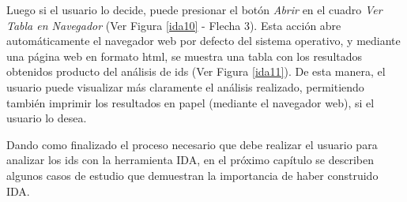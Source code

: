 
Luego si el usuario lo decide, puede presionar el botón \textit{Abrir} en el cuadro \textit{Ver Tabla en Navegador} (Ver Figura \ref{ida10} - Flecha 3). Esta acción abre automáticamente el navegador web por defecto del sistema operativo, y mediante una página web en formato html, se muestra una tabla con los resultados obtenidos producto del análisis de ids (Ver Figura \ref{ida11}). De esta manera, el usuario puede visualizar más claramente el análisis realizado, permitiendo también imprimir los resultados en papel (mediante el navegador web), si el usuario lo desea.

Dando como finalizado el proceso necesario que debe realizar el usuario para analizar los ids con la herramienta IDA, en el próximo capítulo se describen algunos casos de estudio que demuestran la importancia de haber construido IDA.

